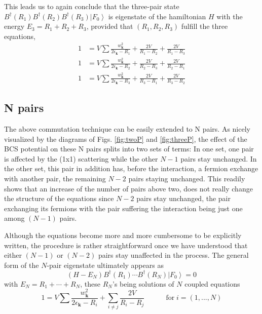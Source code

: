 \documentclass[aps,prb,superscriptaddress,twocolumn]{revtex4}
\begin{document}
This leads us to again conclude that the three-pair state $%
B^{\dagger}(R_1)B^{\dagger}(R_2)B^{\dagger}(R_3)\left|F_0\right>  $ is
eigenstate of the hamiltonian $H$ with the energy $E _3=R_1+R_2+R_3$,
provided that $\left(R_1,R_2, R_3\right) $ fulfill the three equations, 
\begin{equation}
\begin{split}
1&=V\sum\frac{w_{\mathbf{k} }^2}{2\epsilon_{\mathbf{k} }-R_1}+\frac{2V}{R_1-R_2%
}+\frac{2V}{R_1-R_3} \\
1&=V\sum\frac{w_{\mathbf{k} }^2}{2\epsilon_{\mathbf{k} }-R_2}+\frac{2V}{R_2-R_3%
}+\frac{2V}{R_2-R_1} \\
1&=V\sum\frac{w_{\mathbf{k} }^2}{2\epsilon_{\mathbf{k} }-R_3}+\frac{2V}{R_3-R_1%
}+\frac{2V}{R_3-R_2}
\end{split}%
\end{equation}

\subsection{N pairs}

The above commutation technique can be easily extended to N pairs. As nicely
visualized by the diagrams of Figs. \ref{fig:twoP} and \ref{fig:threeP}, the
effect of the BCS potential on these N pairs splits into two sets of terms:
In one set, one pair is affected by the (1x1) scattering while the other $N-1
$ pairs stay unchanged. In the other set, this pair in addition has, before the interaction, a fermion
exchange with another pair, the remaining $N-2$
pairs staying unchanged. This readily shows that an increase of the number
of pairs above two, does not really change the structure of the equations
since $N-2$ pairs stay unchanged, the pair exchanging its fermions with the
pair suffering the interaction being just one among $(N-1)$ pairs.

Although the equations become more and more cumbersome to be explicitly
written, the procedure is rather straightforward once we have understood
that either $(N-1)$ or $(N-2)$ pairs stay unaffected in the process. The
general form of the $N$-pair eigenstate ultimately appears as 
\begin{equation}  \label{eq:SchThreeN}
(H-E _N)B^{\dagger}(R_1)\cdots{}B^{\dagger}(R_N)\left|F_0\right>  =0
\end{equation}
with $E _N=R_1+\cdots+R_N$, these $R_N$'s being solutions of $N$ coupled
equations 
\begin{equation}
1=V\sum\frac{w_{\mathbf{k} }^2}{2\epsilon_{\mathbf{k} }-R_i}+\sum_{i\neq{j}}%
\frac{2V}{R_i-R_j}\quad\qquad \text{for}\; i=\left(1,...,N\right) 
\end{equation}
\end{document}
